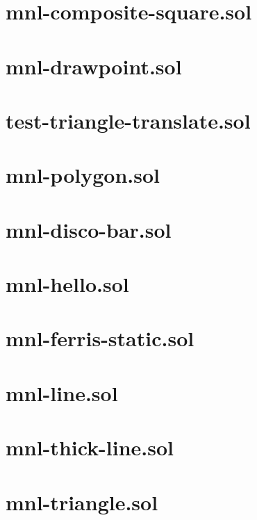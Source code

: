 \section{mnl-composite-square.sol}


\section{mnl-drawpoint.sol}


\section{test-triangle-translate.sol}


\section{mnl-polygon.sol}


\section{mnl-disco-bar.sol}


\section{mnl-hello.sol}


\section{mnl-ferris-static.sol}


\section{mnl-line.sol}


\section{mnl-thick-line.sol}


\section{mnl-triangle.sol}


